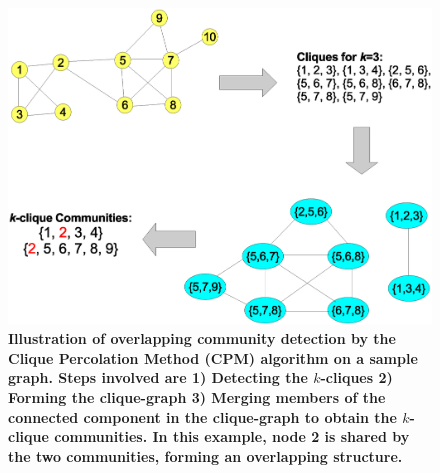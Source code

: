 \begin{figure}%
  \centering
    \includegraphics[scale=0.4]{cpm.eps}
    
  \caption{{\bf Illustration of overlapping community detection by the Clique Percolation Method (CPM) algorithm on a sample graph. Steps involved are 1) Detecting the $k$-cliques 2) Forming the clique-graph 3) Merging members of the connected component in the clique-graph to obtain the $k$-clique communities. In this example, node 2 is shared by the two communities, forming an overlapping structure.}}
\label{fig-cpm}
\end{figure}



